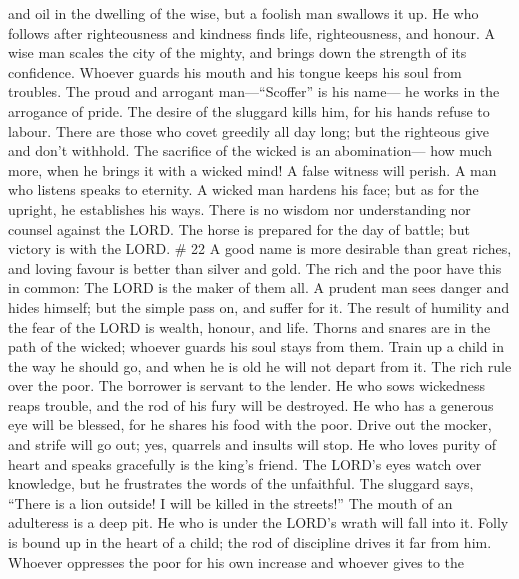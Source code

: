 and oil in the dwelling of the wise, but a foolish man swallows it up.
 He who follows after righteousness and kindness finds
life, righteousness, and honour.  A wise man scales the
city of the mighty, and brings down the strength of its confidence.
 Whoever guards his mouth and his tongue keeps his soul
from troubles.  The proud and arrogant man---``Scoffer'' is
his name--- he works in the arrogance of pride.  The desire
of the sluggard kills him, for his hands refuse to labour. 
There are those who covet greedily all day long; but the righteous give
and don't withhold.  The sacrifice of the wicked is an
abomination--- how much more, when he brings it with a wicked mind!
 A false witness will perish. A man who listens speaks to
eternity.  A wicked man hardens his face; but as for the
upright, he establishes his ways.  There is no wisdom nor
understanding nor counsel against the LORD.  The horse is
prepared for the day of battle; but victory is with the LORD. \# 22
 A good name is more desirable than great riches, and loving
favour is better than silver and gold.  The rich and the
poor have this in common: The LORD is the maker of them all.
 A prudent man sees danger and hides himself; but the simple
pass on, and suffer for it.  The result of humility and the
fear of the LORD is wealth, honour, and life.  Thorns and
snares are in the path of the wicked; whoever guards his soul stays from
them.  Train up a child in the way he should go, and when he
is old he will not depart from it.  The rich rule over the
poor. The borrower is servant to the lender.  He who sows
wickedness reaps trouble, and the rod of his fury will be destroyed.
 He who has a generous eye will be blessed, for he shares
his food with the poor.  Drive out the mocker, and strife
will go out; yes, quarrels and insults will stop.  He who
loves purity of heart and speaks gracefully is the king's friend.
 The LORD's eyes watch over knowledge, but he frustrates
the words of the unfaithful.  The sluggard says, ``There is
a lion outside! I will be killed in the streets!''  The
mouth of an adulteress is a deep pit. He who is under the LORD's wrath
will fall into it.  Folly is bound up in the heart of a
child; the rod of discipline drives it far from him. 
Whoever oppresses the poor for his own increase and whoever gives to the
